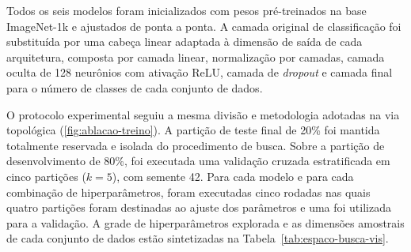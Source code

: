 Todos os seis modelos foram inicializados com pesos pré-treinados na base ImageNet-1k e ajustados de ponta a ponta. A camada original de classificação foi substituída por uma cabeça linear adaptada à dimensão de saída de cada arquitetura, composta por camada linear, normalização por camadas, camada oculta de 128 neurônios com ativação ReLU, camada de \textit{dropout} e camada final para o número de classes de cada conjunto de dados.

O protocolo experimental seguiu a mesma divisão e metodologia adotadas na via topológica (\ref{fig:ablacao-treino}). A partição de teste final de 20\% foi mantida totalmente reservada e isolada do procedimento de busca. Sobre a partição de desenvolvimento de 80\%, foi executada uma validação cruzada estratificada em cinco partições ($k = 5$), com semente 42. Para cada modelo e para cada combinação de hiperparâmetros, foram executadas cinco rodadas nas quais quatro partições foram destinadas ao ajuste dos parâmetros e uma foi utilizada para a validação. A grade de hiperparâmetros explorada e as dimensões amostrais de cada conjunto de dados estão sintetizadas na Tabela~\ref{tab:espaco-busca-vis}.

\begin{table}[htb]
\centering
\caption{Dimensões amostrais e espaço de busca de hiperparâmetros estratificado por conjunto de dados na via visual.}
\label{tab:espaco-busca-vis}
\small
{}
\end{table}

